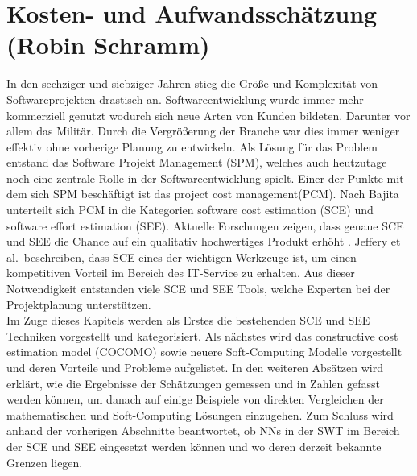 \section{{\large Kosten- und Aufwandsschätzung (Robin Schramm)}} \label{KostenAufwand}
In den sechziger und siebziger Jahren stieg die Größe und Komplexität von Softwareprojekten drastisch an\cite{Bajta2018}. Softwareentwicklung wurde immer mehr kommerziell genutzt wodurch sich neue Arten von Kunden bildeten. Darunter vor allem das Militär. Durch die Vergrößerung der Branche war dies immer weniger effektiv ohne vorherige Planung zu entwickeln. Als Lösung für das Problem entstand das Software Projekt Management (SPM), welches auch heutzutage noch eine zentrale Rolle in der Softwareentwicklung spielt\cite{Bajta2018}. Einer der Punkte mit dem sich SPM beschäftigt ist das project cost management(PCM). Nach Bajita\cite{Bajta2018} unterteilt sich PCM in die Kategorien software cost estimation (SCE) und software effort estimation (SEE). Aktuelle Forschungen zeigen, dass genaue SCE und SEE die Chance auf ein qualitativ hochwertiges Produkt erhöht \cite{Matson1994}\cite{Bilgaiyan2016}. Jeffery et al.~beschreiben, dass SCE eines der wichtigen Werkzeuge ist, um einen kompetitiven Vorteil im Bereich des IT-Service zu erhalten\cite{Jeffery1990}. Aus dieser Notwendigkeit entstanden viele SCE und SEE Tools, welche Experten bei der Projektplanung unterstützen.
\\
Im Zuge dieses Kapitels werden als Erstes die bestehenden SCE und SEE Techniken vorgestellt und kategorisiert. Als nächstes wird das constructive cost estimation model (COCOMO) sowie neuere Soft-Computing Modelle vorgestellt und deren Vorteile und Probleme aufgelistet. In den weiteren Absätzen wird erklärt, wie die Ergebnisse der Schätzungen gemessen und in Zahlen  gefasst werden können, um danach auf einige Beispiele von direkten Vergleichen der mathematischen und Soft-Computing Lösungen einzugehen. Zum Schluss wird anhand der vorherigen Abschnitte beantwortet, ob NNs in der SWT im Bereich der SCE und SEE eingesetzt werden können und wo deren derzeit bekannte Grenzen liegen.

